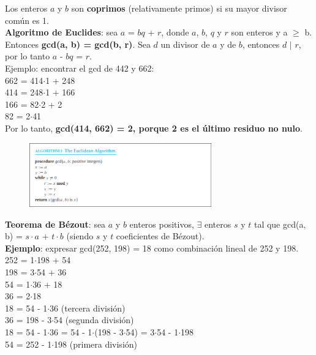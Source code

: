 \documentclass{article}
\begin{document}
Los enteros $a$ y $b$ son \textbf{coprimos} (relativamente primos) si su mayor divisor común es 1. \\

\textbf{Algoritmo de Euclides}: sea $a$ = $bq$ + $r$, donde $a$, $b$, $q$ y $r$ son enteros y a $\geq$ b. Entonces \textbf{gcd(a, b) = gcd(b, r)}. Sea $d$ un divisor de $a$ y de $b$, entonces $d$ $|$ $r$, por lo tanto $a$ - $bq$ = $r$. \\
Ejemplo: encontrar el gcd de 442 y 662: \\
662 = 414$\cdot$1 + 248 \\
414 = 248$\cdot$1 + 166 \\
166 = 82$\cdot$2 + 2 \\
82 = 2$\cdot$41 \\
Por lo tanto, \textbf{gcd(414, 662) = 2, porque 2 es el último residuo no nulo}.

\begin{figure}[h]
    \centering
    \includegraphics[width=0.7\textwidth]{img-t1/img_850_40.png}
\end{figure}

\textbf{Teorema de Bézout}: sea $a$ y $b$ enteros positivos, $\exists$ enteros $s$ y $t$ tal que gcd(a, b) = $s \cdot a$ + $t \cdot b$ (siendo $s$ y $t$ coeficientes de Bézout).\\
\textbf{Ejemplo}: expresar gcd(252, 198) = 18 como combinación lineal de 252 y 198. \\
252 = 1$\cdot$198 + 54 \\
198 = 3$\cdot$54 + 36 \\
54 = 1$\cdot$36 + 18 \\
36 = 2$\cdot$18 \\

18 = 54 - 1$\cdot$36 (tercera división)\\
36 = 198 - 3$\cdot$54 (segunda división)\\

18 = 54 - 1$\cdot$36 = 54 - 1$\cdot$(198 - 3$\cdot$54) = 3$\cdot$54 - 1$\cdot$198 \\
54 = 252 - 1$\cdot$198 (primera división) \\
\end{document}
